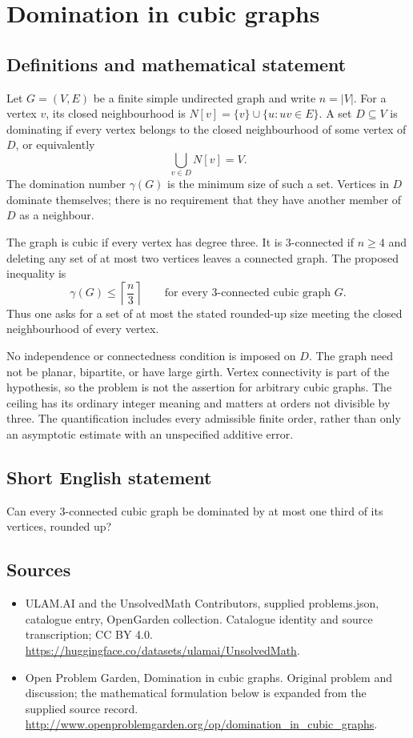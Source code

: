 \documentclass[11pt,a4paper]{article}
\begin{document}
\section*{Domination in cubic graphs}\label{statement}

\subsection{Definitions and mathematical statement}
Let $G=(V,E)$ be a finite simple undirected graph and write
$n=|V|$. For a vertex $v$, its closed neighbourhood is
$N[v]=\{v\}\cup\{u:uv\in E\}$. A set $D\subseteq V$ is dominating
if every vertex belongs to the closed neighbourhood of some vertex
of $D$, or equivalently
\[
 \bigcup_{v\in D}N[v]=V.
\]
The domination number $\gamma(G)$ is the minimum size of such a
set. Vertices in $D$ dominate themselves; there is no requirement
that they have another member of $D$ as a neighbour.

The graph is cubic if every vertex has degree three. It is
$3$-connected if $n\geq4$ and deleting any set of at most two
vertices leaves a connected graph. The proposed inequality is
\[
 \gamma(G)\leq\left\lceil\frac n3\right\rceil
 \qquad\text{for every $3$-connected cubic graph }G.
\]
Thus one asks for a set of at most the stated rounded-up size
meeting the closed neighbourhood of every vertex.

No independence or connectedness condition is imposed on $D$.
The graph need not be planar, bipartite, or have large girth.
Vertex connectivity is part of the hypothesis, so the problem
is not the assertion for arbitrary cubic graphs. The ceiling
has its ordinary integer meaning and matters at orders not
divisible by three. The quantification includes every admissible
finite order, rather than only an asymptotic estimate with an
unspecified additive error.
\subsection{Short English statement}
Can every 3-connected cubic graph be dominated by at most one third of its vertices, rounded up?
\subsection{Sources}
\begin{itemize}
\item[S1] ULAM.AI and the UnsolvedMath Contributors, supplied problems.json, catalogue entry, OpenGarden collection. Catalogue identity and source transcription; CC BY 4.0.
\url{https://huggingface.co/datasets/ulamai/UnsolvedMath}.
\item[S2] Open Problem Garden, Domination in cubic graphs. Original problem and discussion; the mathematical formulation below is expanded from the supplied source record.
\url{http://www.openproblemgarden.org/op/domination_in_cubic_graphs}.
\end{itemize}
\end{document}
